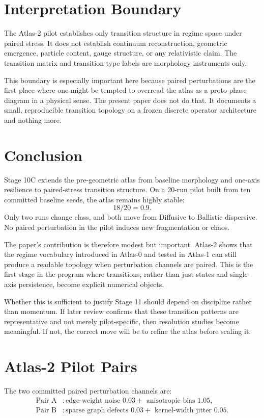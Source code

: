 \documentclass[11pt]{article}
\begin{document}
\section{Interpretation Boundary}
The Atlas-2 pilot establishes only transition structure in regime space under paired stress. It does not establish continuum reconstruction, geometric emergence, particle content, gauge structure, or any relativistic claim. The transition matrix and transition-type labels are morphology instruments only.

This boundary is especially important here because paired perturbations are the first place where one might be tempted to overread the atlas as a proto-phase diagram in a physical sense. The present paper does not do that. It documents a small, reproducible transition topology on a frozen discrete operator architecture and nothing more.

\section{Conclusion}
Stage 10C extends the pre-geometric atlas from baseline morphology and one-axis resilience to paired-stress transition structure. On a 20-run pilot built from ten committed baseline seeds, the atlas remains highly stable:
\begin{equation}
18/20 = 0.9.
\end{equation}
Only two runs change class, and both move from Diffusive to Ballistic dispersive. No paired perturbation in the pilot induces new fragmentation or chaos.

The paper's contribution is therefore modest but important. Atlas-2 shows that the regime vocabulary introduced in Atlas-0 and tested in Atlas-1 can still produce a readable topology when perturbation channels are paired. This is the first stage in the program where transitions, rather than just states and single-axis persistence, become explicit numerical objects.

Whether this is sufficient to justify Stage 11 should depend on discipline rather than momentum. If later review confirms that these transition patterns are representative and not merely pilot-specific, then resolution studies become meaningful. If not, the correct move will be to refine the atlas before scaling it.

\appendix
\section{Atlas-2 Pilot Pairs}
The two committed paired perturbation channels are:
\begin{align}
\text{Pair A} &: \text{edge-weight noise } 0.03 + \text{ anisotropic bias } 1.05, \\
\text{Pair B} &: \text{sparse graph defects } 0.03 + \text{ kernel-width jitter } 0.05.
\end{align}
\end{document}
